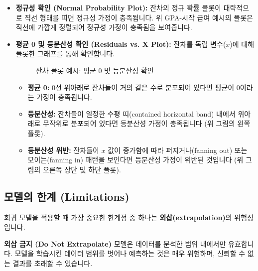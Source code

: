 \documentclass[11pt,a4paper]{article}
\theoremstyle{definition}
\begin{document}
\begin{itemize}
    \item \textbf{정규성 확인 (Normal Probability Plot):}
    잔차의 정규 확률 플롯이 대략적으로 직선 형태를 띠면 정규성 가정이 충족됩니다. 위 GPA-시작 급여 예시의 플롯은 직선에 가깝게 정렬되어 정규성 가정이 충족됨을 보여줍니다.

    \item \textbf{평균 0 및 등분산성 확인 (Residuals vs. X Plot):}
    잔차를 독립 변수($x$)에 대해 플롯한 그래프를 통해 확인합니다.
    \begin{figure}[h!]
        \centering
        \caption{잔차 플롯 예시: 평균 0 및 등분산성 확인}
        \label{fig:residual_plots_good_bad}
    \end{figure}
    \begin{tcolorbox}[colback=lightblue,colframe=darkblue,title={평균 0 및 등분산성 가정 확인}]
    \begin{itemize}
        \item \textbf{평균 0:} 0선 위아래로 잔차들이 거의 같은 수로 분포되어 있다면 평균이 0이라는 가정이 충족됩니다.
        \item \textbf{등분산성:} 잔차들이 일정한 수평 띠(contained horizontal band) 내에서 위아래로 무작위로 분포되어 있다면 등분산성 가정이 충족됩니다 (위 그림의 왼쪽 플롯).
        \item \textbf{등분산성 위반:} 잔차들이 $x$ 값이 증가함에 따라 퍼지거나(fanning out) 또는 모이는(fanning in) 패턴을 보인다면 등분산성 가정이 위반된 것입니다 (위 그림의 오른쪽 상단 및 하단 플롯).
    \end{itemize}
    \end{tcolorbox}
\end{itemize}

\subsection{모델의 한계 (Limitations)}
회귀 모델을 적용할 때 가장 중요한 한계점 중 하나는 \textbf{외삽(extrapolation)}의 위험성입니다.

\begin{cautionbox}
\textbf{외삽 금지 (Do Not Extrapolate)}
모델은 데이터를 분석한 범위 내에서만 유효합니다. 모델을 학습시킨 데이터 범위를 벗어나 예측하는 것은 매우 위험하며, 신뢰할 수 없는 결과를 초래할 수 있습니다.
\end{cautionbox}
\end{document}
